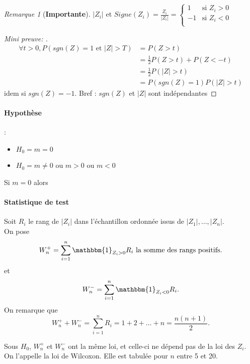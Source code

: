 \documentclass{article}
\theoremstyle{plain}%
\theoremstyle{definition}
\theoremstyle{remark}
\newtheorem*{rem}{Remarque}
\begin{document}
\begin{rem}[\textbf{Importante}]
    $ \left| Z_i \right|  $ et $ Signe(Z_i) = \frac{Z_i}{\left| Z_i \right| } = \begin{cases}
    1 &\text{si } Z_i > 0\\
    -1  &\text{si } Z_i < 0\\
    \end{cases} $ 

    \begin{proof}[Mini preuve: ]
        \begin{align*}
            \forall t > 0, P(sgn(Z) = 1 \text{ et } \left| Z \right| > T ) &= P(Z > t) \\ 
            &= \frac{1}{2} P(Z > t) + P(Z < -t) \\
            &= \frac{1}{2} P( \left| Z \right| > t) \\
            &= P(sgn(Z) = 1) P(\left| Z \right| > t)
        \end{align*}
        idem si $ sgn(Z) = -1 $. Bref : $ sgn(Z) $ et $ \left| Z \right|  $ sont indépendantes
    \end{proof}
\end{rem}

\paragraph*{Hypothèse}:
\begin{itemize}
    \item $ H_0 = m = 0$ 
    \item $ H_0 = m \neq 0 $ ou $ m > 0 $ ou $ m < 0 $ 
\end{itemize}
Si $ m=0 $ alors $  $

\paragraph*{Statistique de test} Soit $ R_i $ le rang de $ \left| Z_i \right|  $ dans l'échantillon ordonnée issus de $ \left| Z_1 \right| , \dots, \left| Z_n \right|  $. \\ 
On pose 
\[
    W_n^+ = \sum_{i=1}^{n}\mathbbm{1}_{Z_i > 0}R_i \text{ la somme des rangs positifs}
.\]
et 
\[
    W_n^- = \sum_{i=1}^{n}\mathbbm{1}_{Z_i < 0}R_i
.\]
On remarque que 
\[
    W_n^+ + W_n^- = \sum_{i=1}^{n}R_i = 1 + 2 + \dots + n = \frac{n(n+1)}{2}
.\]

Sous $ H_0 $, $ W_n^+ $ et $ W_n^- $ ont la même loi, et celle-ci ne dépend pas de la loi des $ Z_i $. On l'appelle la loi de Wilcoxon. Elle est tabulée pour $ n $ entre 5 et 20.
\end{document}
